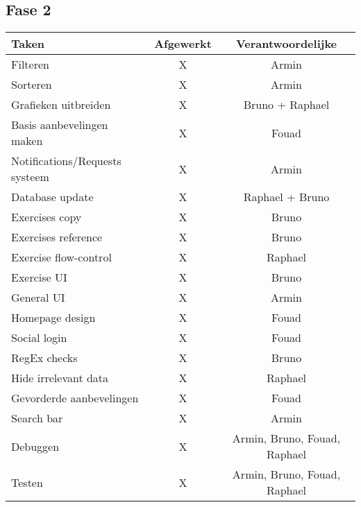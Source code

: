 \subsection{Fase 2}
\begin{tabular}{| l | c | c |}
    \hline
    Taken   &   Afgewerkt   &   Verantwoordelijke \\
    \hline \hline
    Filteren                &   X   &   Armin   \\
    Sorteren                &   X   &   Armin   \\
    Grafieken uitbreiden    &   X   &   Bruno + Raphael \\
    Basis aanbevelingen maken &   X   & Fouad \\
    Notifications/Requests systeem &  X  & Armin \\
    Database update         &   X   &   Raphael + Bruno \\
    Exercises copy          &   X   &   Bruno   \\
    Exercises reference     &   X   &   Bruno   \\
    Exercise flow-control   &   X   &   Raphael \\
    Exercise UI             &   X   &   Bruno   \\
    General UI              &   X   &   Armin   \\
    Homepage design         &   X   &   Fouad   \\
    Social login            &   X   &   Fouad   \\
    RegEx checks            &   X   &   Bruno   \\
    Hide irrelevant data    &   X   &   Raphael \\
    Gevorderde aanbevelingen    &   X   &   Fouad   \\
    Search bar              &   X   &   Armin   \\
    \hline
    Debuggen               &   X   &   Armin, Bruno, Fouad, Raphael    \\
    Testen                 &   X   &   Armin, Bruno, Fouad, Raphael    \\
    \hline
\end{tabular}
